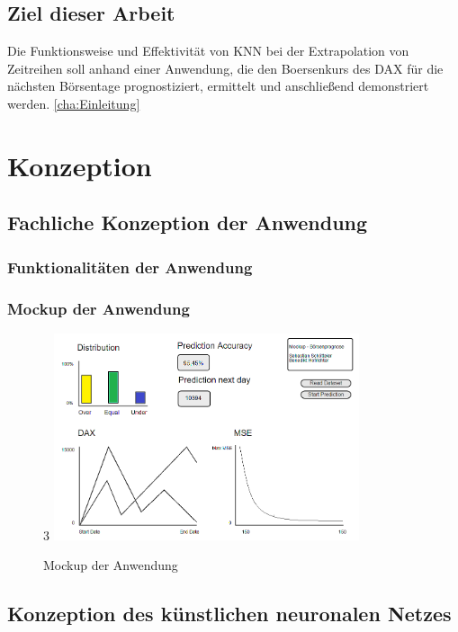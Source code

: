 \documentclass[a4paper,DIV11,bibliography=totoc,headings=normal,ngerman,headsepline]{scrreprt}
\begin{document}
\section{Ziel dieser Arbeit}
\label{sec:Ziel}
Die Funktionsweise und Effektivität von KNN bei der Extrapolation von Zeitreihen soll anhand einer Anwendung, die den Boersenkurs des DAX für die nächsten Börsentage prognostiziert, ermittelt und anschließend demonstriert werden.
\ref{cha:Einleitung}
 
\chapter{Konzeption} %
\label{cha:Konzeption}
\section{Fachliche Konzeption der Anwendung} %
\label{sec:Konzeption Anwendung}
\subsection{Funktionalitäten der Anwendung} %
\label{subsec:Funktionalitäten Anwendung}
\subsection{Mockup der Anwendung} %
\label{subsec:Mockup Anwendung}

\begin{figure}[htbp]3
\centering
		\includegraphics[width=0.80\textwidth]{mockup.PNG}
	\caption{Mockup der Anwendung}
	\label{fig:Mockup der Anwendung}
\end{figure}


\section{Konzeption des künstlichen neuronalen Netzes} %
\end{document}
